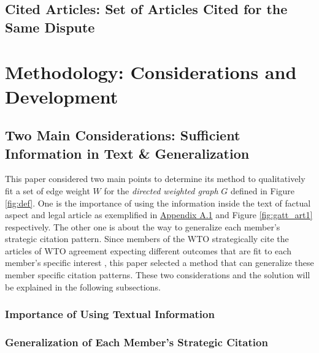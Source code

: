 \documentclass[12pt,letterpaper]{article}
\begin{document}
\subsection{Cited Articles: Set of Articles Cited for the Same Dispute}


\section{Methodology: Considerations and Development}


\subsection{Two Main Considerations: Sufficient Information in Text \& Generalization} \label{justification-nn}
This paper considered two main points to
determine its method to qualitatively fit a set of edge weight $W$ for the \textit{directed weighted graph} $G$ defined in Figure \ref{fig:def}.
One is the importance of using the information inside the text of factual aspect and legal article as exemplified in \hyperref[sub:factual-aspect-example]{Appendix A.1} and Figure {\ref{fig:gatt_art1}} respectively. The other one is about the way to generalize each member's strategic citation pattern. Since members of the WTO strategically cite
the articles of WTO agreement expecting different outcomes that are fit to each member's specific interest \citep{who_gets, pelc, latent}, this paper
selected a method that can generalize these member specific citation patterns. These two considerations and the solution will be explained in the following subsections.
 

\subsubsection{Importance of Using Textual Information}


\subsubsection{Generalization of Each Member's Strategic Citation}
\end{document}
